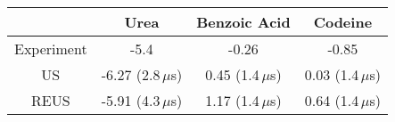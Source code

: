 



\newcommand{\hl}[1]{\textbf{#1}}
\providecommand{\e}[1]{\ensuremath{\times 10^{#1}}}


\begin{table}[h]
\centering
{
\begin{tabular}{|c|c|c|c|}
\hline
 & Urea & Benzoic Acid & Codeine     \\ \hline 
Experiment & -5.4          & -0.26                                             & -0.85      \\ \hline
US                & -6.27 (2.8\,$\mu$s)   & 0.45 (1.4\,$\mu$s)             & 0.03 (1.4\,$\mu$s)   \\ \hline
REUS              &  -5.91 (4.3\,$\mu$s)   & 1.17 (1.4\,$\mu$s)   & 0.64 (1.4\,$\mu$s)   \\ \hline

\end{tabular}}
\end{table}
